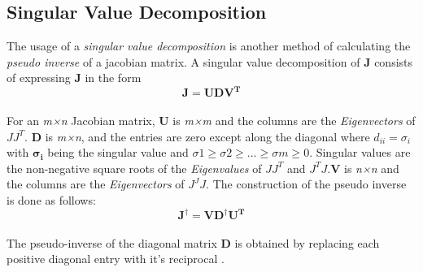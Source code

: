 \subsection{Singular Value Decomposition}
The usage of a \textit{singular value decomposition} is another method of calculating the \textit{pseudo inverse} of a jacobian matrix. A singular value decomposition of \textbf{J} consists of expressing \textbf{J} in the form\\
\begin{equation}
\pmb{J} = \pmb{UDV^{T}}
\end{equation} 
\\For an \textit{m×n} Jacobian matrix, \textbf{U} is\textit{ m×m} and the columns are the \textit{Eigenvectors} of $JJ^{T}$. \textbf{D} is \textit{m×n}, and the entries are zero except along the diagonal where $d_{ii}=\sigma_{i}$ with $\pmb{\sigma_{i}}$ being the singular value and $\sigma 1\geq \sigma 2 \geq ...\geq \sigma m \geq 0$. Singular values are the non-negative square roots of the \textit{Eigenvalues} of $JJ^{T}$ and $ J^{T}J$.\textbf{V} is \textit{n×n} and the columns are the \textit{Eigenvectors} of $J^{J}J$.
The construction of the pseudo inverse is done as follows:\\
\begin{equation}
\pmb{J}^{\dagger} = \pmb{VD^{\dagger}U^{T}}
\end{equation} 
\\The pseudo-inverse of the diagonal matrix \textbf{D} is obtained by replacing each positive diagonal entry with it's reciprocal \cite{Golub.1965}.
